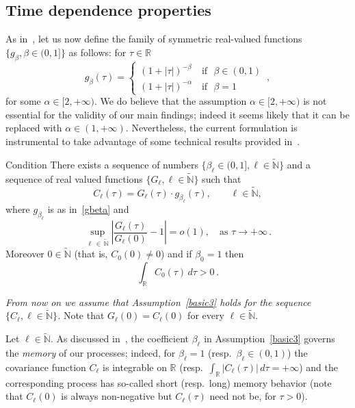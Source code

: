 \documentclass[10pt]{amsart}
\theoremstyle{definition}\newtheorem{defi}[theo]{Definition}\newtheorem{rema}[theo]{Remark}\newtheorem{exam}[theo]{Example}\newtheorem{exem}[theo]{Example}\newtheorem{nota}[theo]{Notation}
\newcommand{\bbR}{\mathbb{R}}
\newcommand{\bbN}{\mathbb{N}}
\begin{document}
\subsection{Time dependence properties}

As in~\cite{MRV:20}, let us now define the family of symmetric real-valued functions $\{ g_\beta, \beta\in (0,1]\}$ as follows: for $\tau\in \bbR$
\begin{equation}\label{gbeta}
g_\beta(\tau) =
\begin{cases}
(1 + |\tau|)^{-\beta}\, & \text{if }\,\, \beta\in (0,1) \\
(1+|\tau|)^{-\alpha}\, & \text{if }\,\, \beta = 1
\end{cases}
\,,
\end{equation}
for some $\alpha \in [2,+\infty)$. We do believe that the assumption $\alpha
\in [2,+\infty)$ is not essential for the validity of our main findings; indeed it seems likely that it can be replaced with $\alpha \in (1, +\infty)$. Nevertheless, the current formulation is instrumental to take advantage of some technical results provided in~\cite{MRV:20}.

\begin{enonce}{Condition}\label{basic3}
There exists a sequence of numbers $\{ \beta_\ell\in (0,1], \ell
\in \widetilde{\bbN}\}$ and a sequence of real valued functions $\{ G_\ell, \ell
\in \widetilde{\bbN}\}$ such that
\begin{equation*}
C_\ell(\tau) = G_\ell(\tau) \cdot g_{\beta_\ell}(\tau), \qquad \ell\in
\widetilde{\bbN},
\end{equation*}
where $g_{\beta_\ell}$ is as in~\eqref{gbeta} and
\begin{equation*}
\sup_{\ell\,\in\,\widetilde{\bbN}} \left|\frac{G_\ell(\tau)}{G_\ell(0)} - 1\right| = o(1), \quad \text{as }\tau\to +\infty\,.
\end{equation*}
Moreover $0\in \widetilde{\bbN}$ (that is, $C_0(0)\ne 0$) and if $
\beta_0=1$ then
\begin{equation*}
\int_{\bbR} C_0 (\tau)\, d\tau > 0\,.
\end{equation*}
\end{enonce}

\emph{From now on we assume that Assumption~\ref{basic3} holds for the sequence $\{ C_\ell, \ell\in \widetilde{\bbN}\}$.} Note that $G_\ell(0)=C_\ell(0)$ for every $\ell\in \widetilde{\bbN}$.

Let $\ell\in \widetilde{\bbN}$. As discussed in~\cite{MRV:20}, the coefficient $\beta_{\ell }$ in Assumption~\ref{basic3} governs the \emph{ memory} of our processes; indeed, for $\beta_{\ell }=1$ (resp.~$
\beta_\ell\in (0,1)$) the covariance function $C_{\ell }$ is integrable on $\bbR$ (resp.~$\int_{\bbR} |C_\ell(\tau)|\,d\tau = +\infty$) and the corresponding process has so-called short (resp.~long) memory behavior (note that $C_\ell(0)$ is always non-negative but $C_\ell(\tau)$ need not be, for $\tau>0 $).
\end{document}
